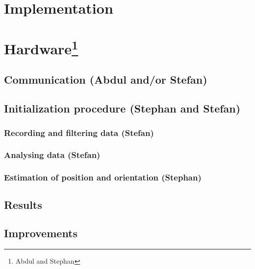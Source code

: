 \section{Implementation}

\section[Hardware]{Hardware\footnote{Abdul and Stephan}}

\subsection{Communication (Abdul and/or Stefan)}

\subsection{Initialization procedure (Stephan and Stefan)}

\subsubsection{Recording and filtering data (Stefan)}

\subsubsection{Analysing data (Stefan)}

\subsubsection{Estimation of position and orientation (Stephan)}

\subsection{Results}

\subsection{Improvements}

